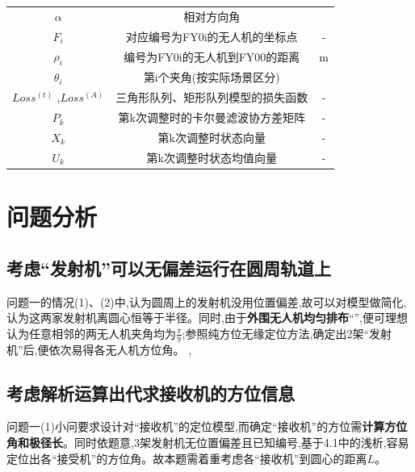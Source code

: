 \documentclass[withoutpreface,bwprint]{cumcmthesis}
\begin{document}
	\begin{center}
		\small
		\renewcommand\arraystretch{3}
		\begin{tabular}{ccc}
			\hline
			\makebox[0.25\textwidth][c]{符号}	& \makebox[0.35\textwidth][c]{意义} & \makebox[0.2\textwidth][c]{单位}	 \\ \hline
			$\alpha$	    & 相对方向角 & \textdegree  \\ \hline
			$F_{i}$	    & 对应编号为FY0i的无人机的坐标点 &  -\\ \hline
			$\rho_{i}$	    & 编号为FY0i的无人机到FY00的距离 & m  \\ \hline
			$\theta_{i}$	    & 第i个夹角(按实际场景区分)& \textdegree  \\ \hline
			$Loss^{(t)}$ ,$Loss^{(A)}$	    &三角形队列、矩形队列模型的损失函数& -  \\ \hline	
			$P_{k}$	    & 第k次调整时的卡尔曼滤波协方差矩阵& 	-  \\ \hline
			$X_{k}$	    & 第k次调整时状态向量& - 	 \\ \hline
			$U_{k}$	    & 第k次调整时状态均值向量& - 	 \\ \hline
		\end{tabular}
		
	\end{center}
	\section{问题分析}
	
	\subsection{考虑“发射机”可以无偏差运行在圆周轨道上}
	
	问题一的情况(1)、(2)中,认为圆周上的发射机没用位置偏差,故可以对模型做简化,认为这两家发射机离圆心恒等于半径。同时,由于\textbf{外围无人机均匀排布}“”,便可理想认为任意相邻的两无人机夹角均为$\frac{\pi}{9}$;参照纯方位无缘定位方法,确定出2架“发射机”后,便依次易得各无人机方位角。
	,
	\subsection{考虑解析运算出代求接收机的方位信息}
	
	问题一(1)小问要求设计对“接收机”的定位模型,而确定“接收机”的方位需\textbf{计算方位角和极径长}。同时依题意,3架发射机无位置偏差且已知编号,基于4.1中的浅析,容易定位出各“接受机”的方位角。故本题需着重考虑各“接收机”到圆心的距离$L$。
	
\end{document}
